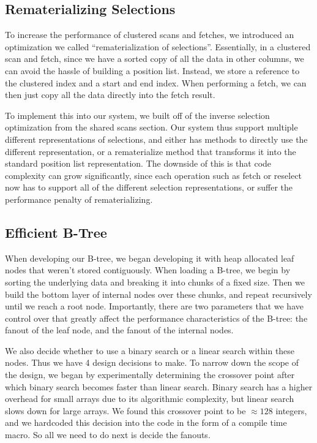 \documentclass[a4paper, 12pt]{article}
\begin{document}
\subsection{Rematerializing Selections}

To increase the performance of clustered scans and fetches, we introduced an optimization we called ``rematerialization of selections''. Essentially, in a clustered scan and fetch, since we have a sorted copy of all the data in other columns, we can avoid the hassle of building a position list. Instead, we store a reference to the clustered index and a start and end index. When performing a fetch, we can then just copy all the data directly into the fetch result.

\medskip
To implement this into our system, we built off of the inverse selection optimization from the shared scans section. Our system thus support multiple different representations of selections, and either has methods to directly use the different representation, or a rematerialize method that transforms it into the standard position list representation. The downside of this is that code complexity can grow significantly, since each operation such as fetch or reselect now has to support all of the different selection representations, or suffer the performance penalty of rematerializing.
 
\subsection{Efficient B-Tree}

When developing our B-tree, we began developing it with heap allocated leaf nodes that weren't stored contiguously. When loading a B-tree, we begin by sorting the underlying data and breaking it into chunks of a fixed size. Then we build the bottom layer of internal nodes over these chunks, and repeat recursively until we reach a root node. Importantly, there are two parameters that we have control over that greatly affect the performance characteristics of the B-tree: the fanout of the leaf node, and the fanout of the internal nodes. 

\medskip
We also decide whether to use a binary search or a linear search within these nodes. Thus we have 4 design decisions to make. To narrow down the scope of the design, we began by experimentally determining the crossover point after which binary search becomes faster than linear search. Binary search has a higher overhead for small arrays due to its algorithmic complexity, but linear search slows down for large arrays. We found this crossover point to be $\approx 128$ integers, and we hardcoded this decision into the code in the form of a compile time macro. So all we need to do next is decide the fanouts. 
\end{document}

